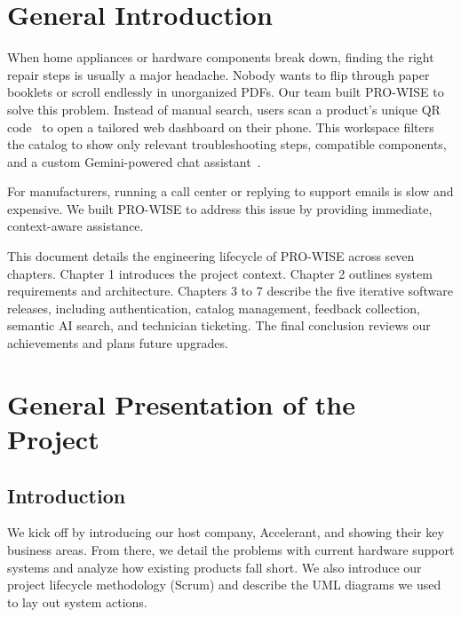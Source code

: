 \documentclass[12pt,a4paper]{report}
\begin{document}
\clearpage
\listoffigures
\thispagestyle{plain}


\clearpage
\listoftables
\thispagestyle{plain}


\chapter*{General Introduction}

When home appliances or hardware components break down, finding the right repair steps is usually a major headache. Nobody wants to flip through paper booklets or scroll endlessly in unorganized PDFs. Our team built PRO-WISE to solve this problem. Instead of manual search, users scan a product's unique QR code~\cite{qrcode} to open a tailored web dashboard on their phone. This workspace filters the catalog to show only relevant troubleshooting steps, compatible components, and a custom Gemini-powered chat assistant~\cite{gemini}.

For manufacturers, running a call center or replying to support emails is slow and expensive. We built PRO-WISE to address this issue by providing immediate, context-aware assistance.

This document details the engineering lifecycle of PRO-WISE across seven chapters. Chapter 1 introduces the project context. Chapter 2 outlines system requirements and architecture. Chapters 3 to 7 describe the five iterative software releases, including authentication, catalog management, feedback collection, semantic AI search, and technician ticketing. The final conclusion reviews our achievements and plans future upgrades.


\clearpage
{}

\chapter{General Presentation of the Project}

\section{Introduction}

We kick off by introducing our host company, Accelerant, and showing their key business areas. From there, we detail the problems with current hardware support systems and analyze how existing products fall short. We also introduce our project lifecycle methodology (Scrum) and describe the UML diagrams we used to lay out system actions.
\end{document}
